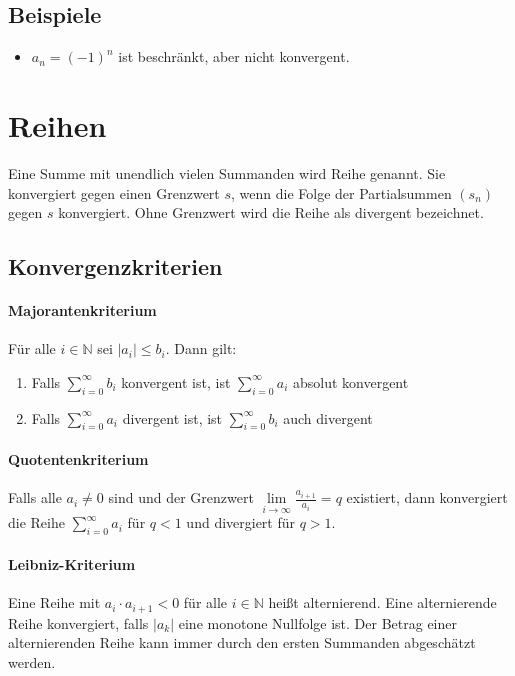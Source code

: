 \documentclass[10pt,a4paper,twoside,twocolumn]{article}
\begin{document}
	\subsection{Beispiele}
	
	\begin{itemize}
		\setlength\itemsep{0em}
		\item $ a_n = (-1)^n $ ist beschränkt, aber nicht konvergent.
	\end{itemize}
	
	\section{Reihen}
	
	Eine Summe mit unendlich vielen Summanden wird Reihe genannt. Sie konvergiert gegen einen Grenzwert $ s $, wenn die Folge der Partialsummen $ (s_n)  $ gegen $ s $ konvergiert. Ohne Grenzwert wird die Reihe als divergent bezeichnet.
	
	\subsection{Konvergenzkriterien}
	
	\paragraph{Majorantenkriterium} Für alle $ i \in \mathbb{N} $ sei $ |a_i| \leq b_i $. Dann gilt:
	
	\begin{enumerate}
		\item Falls $ \sum_{i = 0}^{\infty} b_i $ konvergent ist, ist $ \sum_{i = 0}^{\infty} a_i $ absolut konvergent
		\item Falls $ \sum_{i = 0}^{\infty} a_i $ divergent ist, ist $ \sum_{i = 0}^{\infty} b_i $ auch divergent
	\end{enumerate}

	\paragraph{Quotentenkriterium} Falls alle $ a_i \neq 0 $ sind und der Grenzwert $ \lim\limits_{i \to \infty} \frac{a_{i + 1}}{a_i} = q $ existiert, dann konvergiert die Reihe $ \sum_{i = 0}^{\infty} a_i $ für $ q < 1 $ und divergiert für $ q > 1 $.
	
	\paragraph{Leibniz-Kriterium} Eine Reihe mit $ a_i \cdot a_{i + 1} < 0 $ für alle $ i \in \mathbb{N} $ heißt alternierend. Eine alternierende Reihe konvergiert, falls $ |a_k| $ eine monotone Nullfolge ist. Der Betrag einer alternierenden Reihe kann immer durch den ersten Summanden abgeschätzt werden.
	
\end{document}
